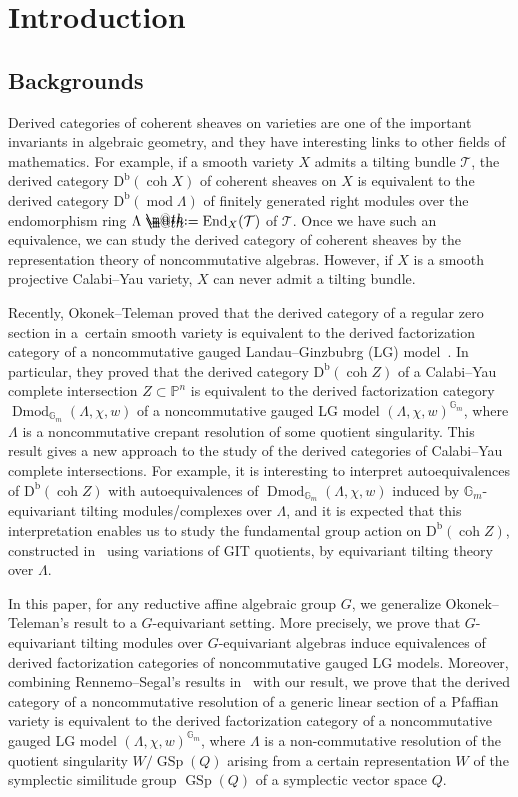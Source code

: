 \documentclass[pdftex]{sigma}%
\makeatletter
\newcommand*{\defeq}{\mathrel{\rlap{%
 \raisebox{0.3ex}{$\m@th\cdot$}}%
 \raisebox{-0.3ex}{$\m@th\cdot$}}%
 =}
\numberwithin{equation}{section}
\newcommand{\Dmod}{\operatorname{Dmod}}
\newcommand{\End}{\operatorname{End}}
\newcommand{\coh}{\operatorname{coh}}
\newcommand{\fmod}{\operatorname{mod}}
\newcommand{\Db}{\operatorname{D^b}}
\newcommand{\GSp}{\operatorname{GSp}}
\newcommand{\cT}{\mathcal{T}}
\newcommand{\bG}{\mathbb{G}}
\newcommand{\bP}{\mathbb{P}}
\makeatother
\begin{document}
\renewcommand{\thefootnote}{\arabic{footnote}}
\setcounter{footnote}{0}

\section{Introduction}

\subsection{Backgrounds}
Derived categories of coherent sheaves on varieties are one of the important invariants in algebraic geometry, and they have interesting links to other fields of mathematics. For example, if a smooth variety $X$ admits a tilting bundle $\cT$, the derived category $\Db(\coh X)$ of coherent sheaves on $X$ is equivalent to the derived category $\Db(\fmod\Lambda)$ of finitely generated right modules over the endomorphism ring $\Lambda\defeq\End_X(\cT)$ of $\cT$.
Once we have such an equivalence, we can study the derived category of coherent sheaves by the representation theory of noncommutative algebras. However, if $X$ is a smooth projective Calabi--Yau variety, $X$ can never admit a tilting bundle.

Recently, Okonek--Teleman proved that the derived category of a regular zero section in a~certain smooth variety is equivalent to the derived factorization category of a noncommutative gauged Landau--Ginzbubrg (LG) model~\cite{ot}. In particular, they proved that the derived category $\Db(\coh Z)$ of a Calabi--Yau complete intersection $Z\subset \bP^n$ is equivalent to the derived factorization category $\Dmod_{\bG_m}(\Lambda,\chi,w)$ of a noncommutative gauged LG model $(\Lambda,\chi,w)^{\bG_m}$, where $\Lambda$ is a noncommutative crepant resolution of some quotient singularity. This result gives a new approach to the study of the derived categories of Calabi--Yau complete intersections. For example, it is interesting to interpret autoequivalences of $\Db(\coh Z)$ with autoequivalences of $\Dmod_{\bG_m}(\Lambda,\chi,w)$ induced by $\bG_m$-equivariant tilting modules/complexes over $\Lambda$, and it is expected that this interpretation enables us to study the fundamental group action on $\Db(\coh Z)$, constructed in~\cite{hl-s} using variations of GIT quotients, by equivariant tilting theory over $\Lambda$.

In this paper, for any reductive affine algebraic group $G$,
we generalize Okonek--Teleman's result to a $G$-equivariant setting. More precisely, we prove that $G$-equivariant tilting modules over $G$-equivariant algebras induce equivalences of derived factorization categories of noncommutative gauged LG models. Moreover, combining Rennemo--Segal's results in~\cite{rs} with our result, we prove that the derived category of a noncommutative resolution of a generic linear section of a Pfaffian variety is equivalent to the derived factorization category of a noncommutative gauged LG model $(\Lambda, \chi, w)^{\mathbb{G}_m}$, where $\Lambda$ is a non-commutative resolution of the quotient singularity $W/\GSp(Q)$ arising from a certain representation $W$ of the symplectic similitude group $\GSp(Q)$ of a symplectic vector space $Q$.
\end{document}
